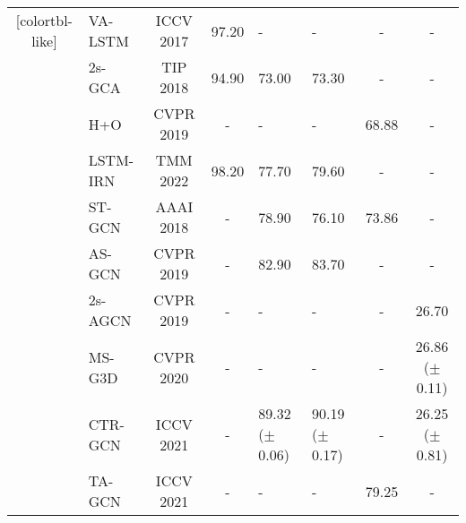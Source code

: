 \documentclass[letterpaper, 10 pt, conference]{ieeeconf}
\begin{document}
\begin{table*}[t]
{\begin{threeparttable}
{\begin{NiceTabular}{c|l|c|c|C{22mm}|C{22mm}|c|c}[colortbl-like]
            &
            VA-LSTM\cite{VA-LSTM2017}&
            ICCV 2017&
            97.20&
            -&
            -&
            -&
            -\\

            &
            2s-GCA\cite{2s-GCA2018}&
            TIP 2018&
            94.90&
            73.00&
            73.30&
            -&
            -\\

            &
            H+O\cite{H+O2019}&
            CVPR 2019&
            -&
            -&
            -&
            68.88&
            -\\

            &
            LSTM-IRN\cite{LSTM-IRN2022}&
            TMM 2022&
            98.20&
            77.70&
            79.60&
            -&
            -\\

            \hline

            &
            ST-GCN\cite{ST-GCN2018}&
            AAAI 2018&
            -&
            78.90&
            76.10&
            73.86&
            -\\

            &
            AS-GCN\cite{AS-GCN2019}&
            CVPR 2019&
            -&
            82.90&
            83.70&
            -&
            -\\

            &
            2s-AGCN\cite{2s-AGCN2019}&
            CVPR 2019&
            -&
            -&
            -&
            -&
            26.70\\

            &
            MS-G3D\cite{MS-G3D2020}&
            CVPR 2020&
            -&
            -&
            -&
            -&
            26.86 ($\pm$0.11)\\

            &
            CTR-GCN\cite{CTR-GCN2021}&
            ICCV 2021&
            -&
            89.32 ($\pm$0.06)&
            90.19 ($\pm$0.17)&
            -&
            26.25 ($\pm$0.81) \\

            &
            TA-GCN\cite{H2O_TA-GCN2021}&
            ICCV 2021&
            -&
            -&
            -&
            79.25&
            -\\


\end{NiceTabular}}
\end{threeparttable}}
\end{table*}
\end{document}
